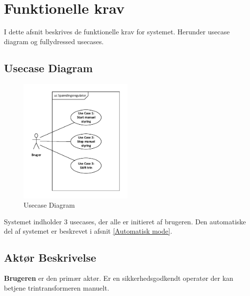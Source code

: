 
\section{Funktionelle krav}
I dette afsnit beskrives de funktionelle krav for systemet. Herunder usecase diagram og fullydressed usecases.

\subsection{Usecase Diagram}

\begin{figure}[htbp] %
	\centering
	\includegraphics[width=0.5\textwidth]{Figure/UsecaseDiagram}
	\caption{Usecase Diagram}
	\label{fig:UsecaseDiagram}
\end{figure}
Systemet indholder 3 usecases, der alle er initieret af brugeren. Den automatiske del af systemet er beskrevet i afsnit \ref{Automatisk mode}.

\subsection{Aktør Beskrivelse}
\textbf{Brugeren} er den primær aktør. Er en sikkerhedsgodkendt operatør der kan betjene trintransformeren manuelt.

